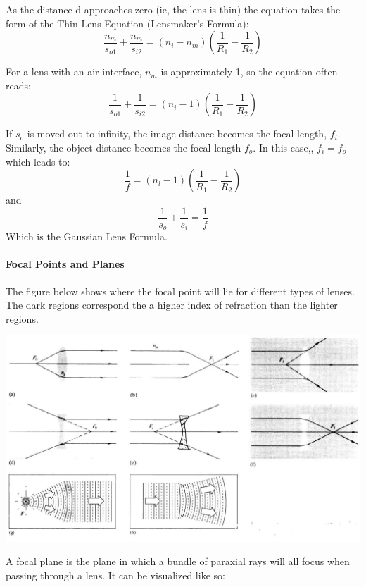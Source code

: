 \documentclass[12pt]{report}
\begin{document}
As the distance d approaches zero (ie, the lens is thin) the equation takes the form of the Thin-Lens Equation (Lensmaker's Formula):
\begin{equation}
\frac{n_m}{s_{o1}}+\frac{n_m}{s_{i2}} = (n_i-n_m)\left(\frac{1}{R_1}-\frac{1}{R_2}\right)
\end{equation}

For a lens with an air interface, $n_m$ is approximately 1, so the equation often reads:
\[\frac{1}{s_{o1}}+\frac{1}{s_{i2}} = (n_i-1)\left(\frac{1}{R_1}-\frac{1}{R_2}\right)\]

If $s_o$ is moved out to infinity, the image distance becomes the focal length, $f_i$. Similarly, the object distance becomes the focal length $f_o$. In this case,, $f_i = f_o$ which leads to:
\begin{equation}
\frac{1}{f} = (n_l - 1)\left(\frac{1}{R_1}-\frac{1}{R_2}\right)
\end{equation}
and
\begin{equation}
\frac{1}{s_o}+\frac{1}{s_i} = \frac{1}{f}
\end{equation}
Which is the Gaussian Lens Formula. 

\paragraph{Focal Points and Planes}

The figure below shows where the focal point will lie for different types of lenses. The dark regions correspond the a higher index of refraction than the lighter regions. 

\includegraphics[scale=.45]{FocalPoint.jpg}

A focal plane is the plane in which a bundle of paraxial rays will all focus when passing through a lens. It can be visualized like so:
\end{document}
